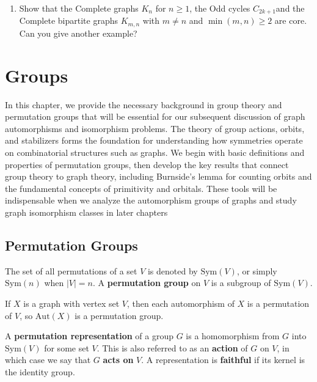 \documentclass[12pt,a4paper,openany]{book}
\begin{document}
\begin{enumerate}
Since $\pi$ is a permutation, $f$ is bijective and its inverse is the homomorphism induced by $\pi^{-1}$.  
Therefore $f$ is an automorphism.)

\textbf{remark:}
This constructive exercises show that  $P$ is a \emph{core}: every endomorphism is an automorphism.


\item Show that the Complete graphs $K_n$ for $n \geq 1$, the Odd cycles $C_{2k+1}$and   the Complete bipartite graphs $K_{m,n}$ with $m \neq n$ and $\min(m,n) \geq 2$ are core. Can you give another example?

\end{enumerate}



\chapter{Groups}

In this chapter, we provide the necessary background in group theory and permutation groups that will be essential for our subsequent discussion of graph automorphisms and isomorphism problems. The theory of group actions, orbits, and stabilizers forms the foundation for understanding how symmetries operate on combinatorial structures such as graphs. We begin with basic definitions and properties of permutation groups, then develop the key results that connect group theory to graph theory, including Burnside's lemma for counting orbits and the fundamental concepts of primitivity and orbitals. These tools will be indispensable when we analyze the automorphism groups of graphs and study graph isomorphism classes in later chapters

\section{Permutation Groups}



The set of all permutations of a set $V$ is denoted by $\mathrm{Sym}(V)$, or simply $\mathrm{Sym}(n)$ when $|V| = n$. A \textbf{permutation group} on $V$ is a subgroup of $\mathrm{Sym}(V)$.

If $X$ is a graph with vertex set $V$, then each automorphism of $X$ is a permutation of $V$, so $\mathrm{Aut}(X)$ is a permutation group.

A \textbf{permutation representation} of a group $G$ is a homomorphism from $G$ into $\mathrm{Sym}(V)$ for some set $V$. This is also referred to as an \textbf{action} of $G$ on $V$, in which case we say that $G$ \textbf{acts on} $V$. A representation is \textbf{faithful} if its kernel is the identity group.
\end{document}
